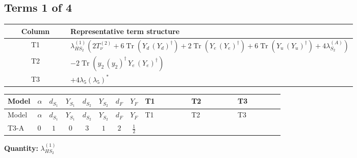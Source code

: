 \documentclass[8pt]{article}
\begin{document}
\begin{landscape}
\subsection*{Terms 1 of 4}
\begin{center}
\begin{tabular}{@{}c >{\raggedright\arraybackslash}p{0.82\linewidth}@{}}
\toprule
Column & Representative term structure \\
\midrule
T1 & \(\displaystyle {\lambda_{HS_2}^{(1)}} (2 T_{\nu}^{(2)}+6 \operatorname{Tr}\!\left({Y_d}\,\left({Y_d}\right)^{\dagger}\right)+2 \operatorname{Tr}\!\left({Y_e}\,\left({Y_e}\right)^{\dagger}\right)+6 \operatorname{Tr}\!\left({Y_u}\,\left({Y_u}\right)^{\dagger}\right)+4 {\lambda_{S_2}^{(A)}})\) \\
\midrule
T2 & \(\displaystyle -2 \operatorname{Tr}\!\left({y_2}\,\left({y_2}\right)^{\dagger}\,{Y_e}\,\left({Y_e}\right)^{\dagger}\right)\) \\
\midrule
T3 & \(\displaystyle +4 {\lambda_5} \left({\lambda_5}\right)^{*}\) \\
\midrule
\bottomrule
\end{tabular}
\end{center}
\smallskip
\tiny
\begin{longtable}{@{}llcccccc >{\raggedright\arraybackslash}p{0.21\linewidth} >{\raggedright\arraybackslash}p{0.21\linewidth} >{\raggedright\arraybackslash}p{0.21\linewidth}@{}}
\toprule
Model & $\alpha$ & $d_{S_1}$ & $Y_{S_1}$ & $d_{S_2}$ & $Y_{S_2}$ & $d_F$ & $Y_F$ & T1 & T2 & T3 \\
\midrule
\endfirsthead
\toprule
Model & $\alpha$ & $d_{S_1}$ & $Y_{S_1}$ & $d_{S_2}$ & $Y_{S_2}$ & $d_F$ & $Y_F$ & T1 & T2 & T3 \\
\midrule
\endhead
T3-A & $0$ & $1$ & $0$ & $3$ & $1$ & $2$ & $\frac{1}{2}$ & \scriptsize\adjustbox{max width=\linewidth}{$\begin{gathered} {\lambda_{HS_2}^{(1)}} (2 T_{\nu}^{(2)}+6 \operatorname{Tr}\!\left({Y_d}\,\left({Y_d}\right)^{\dagger}\right)+2 \operatorname{Tr}\!\left({Y_e}\,\left({Y_e}\right)^{\dagger}\right)+6 \operatorname{Tr}\!\left({Y_u}\,\left({Y_u}\right)^{\dagger}\right)+4 {\lambda_{S_2}^{(A)}})\end{gathered}$} & \scriptsize\adjustbox{max width=\linewidth}{$\begin{gathered} -2 \operatorname{Tr}\!\left({y_2}\,\left({y_2}\right)^{\dagger}\,{Y_e}\,\left({Y_e}\right)^{\dagger}\right)\end{gathered}$} & \scriptsize\adjustbox{max width=\linewidth}{$\begin{gathered} +4 {\lambda_5} \left({\lambda_5}\right)^{*}\end{gathered}$} \\
\midrule
\bottomrule
\end{longtable}
\clearpage
\noindent\textbf{Quantity: }$\lambda_{HS_2}^{(1)}$\par\smallskip

\end{landscape}
\end{document}

